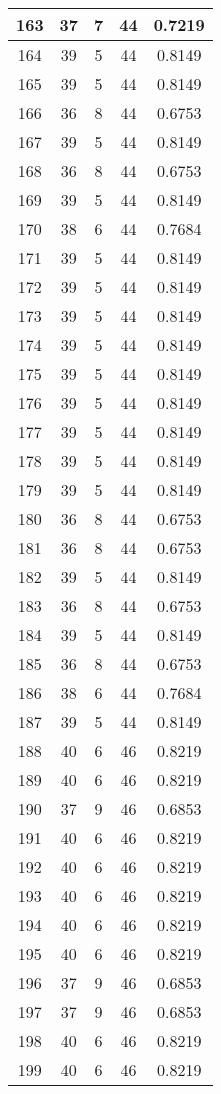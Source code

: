 \documentclass[letterpaper, 12pt]{article}
\begin{document}
\begin{longtable}{|c|c|c|c|c|}
\hline
163 & 37 & 7 & 44 & 0.7219 \\
\hline
164 & 39 & 5 & 44 & 0.8149 \\
\hline
165 & 39 & 5 & 44 & 0.8149 \\
\hline
166 & 36 & 8 & 44 & 0.6753 \\
\hline
167 & 39 & 5 & 44 & 0.8149 \\
\hline
168 & 36 & 8 & 44 & 0.6753 \\
\hline
169 & 39 & 5 & 44 & 0.8149 \\
\hline
170 & 38 & 6 & 44 & 0.7684 \\
\hline
171 & 39 & 5 & 44 & 0.8149 \\
\hline
172 & 39 & 5 & 44 & 0.8149 \\
\hline
173 & 39 & 5 & 44 & 0.8149 \\
\hline
174 & 39 & 5 & 44 & 0.8149 \\
\hline
175 & 39 & 5 & 44 & 0.8149 \\
\hline
176 & 39 & 5 & 44 & 0.8149 \\
\hline
177 & 39 & 5 & 44 & 0.8149 \\
\hline
178 & 39 & 5 & 44 & 0.8149 \\
\hline
179 & 39 & 5 & 44 & 0.8149 \\
\hline
180 & 36 & 8 & 44 & 0.6753 \\
\hline
181 & 36 & 8 & 44 & 0.6753 \\
\hline
182 & 39 & 5 & 44 & 0.8149 \\
\hline
183 & 36 & 8 & 44 & 0.6753 \\
\hline
184 & 39 & 5 & 44 & 0.8149 \\
\hline
185 & 36 & 8 & 44 & 0.6753 \\
\hline
186 & 38 & 6 & 44 & 0.7684 \\
\hline
187 & 39 & 5 & 44 & 0.8149 \\
\hline
188 & 40 & 6 & 46 & 0.8219 \\
\hline
189 & 40 & 6 & 46 & 0.8219 \\
\hline
190 & 37 & 9 & 46 & 0.6853 \\
\hline
191 & 40 & 6 & 46 & 0.8219 \\
\hline
192 & 40 & 6 & 46 & 0.8219 \\
\hline
193 & 40 & 6 & 46 & 0.8219 \\
\hline
194 & 40 & 6 & 46 & 0.8219 \\
\hline
195 & 40 & 6 & 46 & 0.8219 \\
\hline
196 & 37 & 9 & 46 & 0.6853 \\
\hline
197 & 37 & 9 & 46 & 0.6853 \\
\hline
198 & 40 & 6 & 46 & 0.8219 \\
\hline
199 & 40 & 6 & 46 & 0.8219 \\
\hline
\end{longtable}
\end{document}
